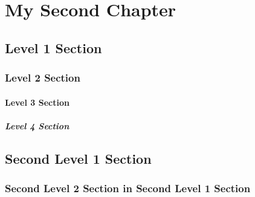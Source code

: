 \chapter{My Second Chapter}	%

\blindtext


\section{Level 1 Section}
\blindtext
\parencite{Silberschatz2005}
\blindtext

%

\subsection{Level 2 Section}
\blindtext

\subsubsection{Level 3 Section}
\blindtext[3]

\paragraph{Level 4 Section}
\blindtext[2]

\section{Second Level 1 Section}
\blindtext

\subsection{Second Level 2 Section in Second Level 1 Section}
\blindtext

\endinput